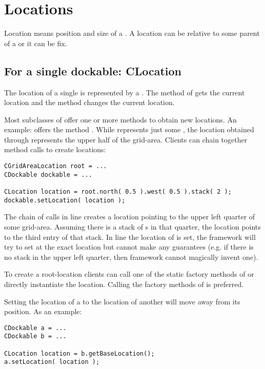 \section{Locations} \label{sec:location}
Location means position and size of a . A location can be relative to some parent of a  or it can be fix.

\subsection{For a single dockable: CLocation}
The location of a single  is represented by a . The method  of  gets the current location and the method \linebreak {} changes the current location.

Most subclasses of  offer one or more methods to obtain new locations. An example:  offers the method . While  represents just some , the location obtained through  represents the upper half of the grid-area. Clients can chain together method calls to create locations:
\begin{lstlisting}
CGridAreaLocation root = ...
CDockable dockable = ...
		
CLocation location = root.north( 0.5 ).west( 0.5 ).stack( 2 );
dockable.setLocation( location );
\end{lstlisting}
The chain of calls in line  creates a location pointing to the upper left quarter of some grid-area. Assuming there is a stack of s in that quarter, the location points to the third entry of that stack. In line  the location of  is set, the framework will try to set  at the exact location but cannot make any guarantees (e.g. if there is no stack in the upper left quarter, then framework cannot magically invent one).

To create a root-location clients can call one of the static factory methods of  or directly instantiate the location. Calling the factory methods of  is preferred.

Setting the location of a   to the location of another   will move away  from its position. As an example:
\begin{lstlisting}
CDockable a = ...
CDockable b = ...

CLocation location = b.getBaseLocation();
a.setLocation( location );
\end{lstlisting}

